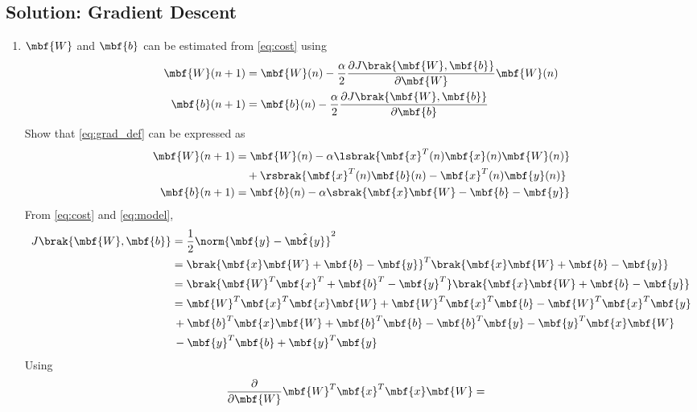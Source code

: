 \documentclass[journal,12pt,twocolumn]{IEEEtran}
\renewcommand\thesection{\arabic{section}}
\renewcommand\thesubsection{\thesection.\arabic{subsection}}
\begin{document}
\subsection{Solution: Gradient Descent}
\begin{enumerate}[label=\thesubsection.\arabic*
,ref=\thesection.\theenumi]
\item $\mbf{W}$ and $\mbf{b}$ can be estimated from \eqref{eq:cost} using
\begin{align}
\label{eq:grad_def}
\mbf{W}(n+1) &= \mbf{W}(n) - \frac{\alpha}{2}\frac{\partial J\brak{\mbf{W},\mbf{b}} }{\partial\mbf{W}}\mbf{W}(n)
\\
\mbf{b}(n+1) &= \mbf{b}(n) - \frac{\alpha}{2}\frac{\partial J\brak{\mbf{W},\mbf{b}}}{\partial\mbf{b}}
\end{align}
Show that \eqref{eq:grad_def} can be expressed as
\begin{align}
\mbf{W}(n+1) &= \mbf{W}(n) - \alpha\lsbrak{\mbf{x}^{T}(n)\mbf{x}(n)\mbf{W}(n)}
\nonumber \\
& \quad +\rsbrak{\mbf{x}^{T}(n)\mbf{b}(n)-\mbf{x}^T(n)\mbf{y}(n)}
\\
\mbf{b}(n+1) &= \mbf{b}(n) - \alpha\sbrak{\mbf{x}\mbf{W}-\mbf{b}-\mbf{y}}
\end{align}
\solution From  \eqref{eq:cost} and \eqref{eq:model}, 
\begin{align}
J\brak{\mbf{W},\mbf{b}}  &= \frac{1}{2}\norm{\mbf{y}-\hat{\mbf{y}}}^2
\\
&=\brak{\mbf{x}\mbf{W}+\mbf{b}-\mbf{y}}^T\brak{\mbf{x}\mbf{W}+\mbf{b}-\mbf{y}}
\\
&=\brak{\mbf{W}^T\mbf{x}^T+\mbf{b}^T-\mbf{y}^T}\brak{\mbf{x}\mbf{W}+\mbf{b}-\mbf{y}}
\\
&=\mbf{W}^T\mbf{x}^T\mbf{x}\mbf{W}+\mbf{W}^T\mbf{x}^T\mbf{b}-\mbf{W}^T\mbf{x}^T\mbf{y}
\\
&\,+\mbf{b}^T\mbf{x}\mbf{W}+\mbf{b}^T\mbf{b}-\mbf{b}^T\mbf{y} - \mbf{y}^T\mbf{x}\mbf{W}
\\
& \, -  \mbf{y}^T\mbf{b} +  \mbf{y}^T \mbf{y}
\label{eq:expand_cost}
\end{align}
Using
\begin{align}
\frac{\partial}{\partial\mbf{W}}\mbf{W}^T\mbf{x}^T\mbf{x}\mbf{W}
&= 
\end{align} 
\end{enumerate}
\end{document}
